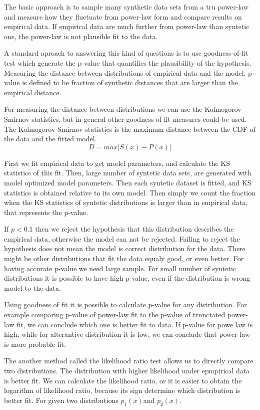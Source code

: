 The basic approach is to sample many synthetic data sets from a tru power-law and measure how they fluctuate from power-law form and compare results on empirical data. If empirical data are much further from power-law than syntetic one, the power-law is not plausible fit to the data. 


A standard aproach to answering this kind of questions is to use goodness-of-fit test which generate the p-value that quantifies the plausibility of the hypothesis. Measuring the distance between distributions of empirical data and the model. p-value is defined to be fraction of synthetic distances that are larger than the empirical distance. 

For measuring the distance between distributions we can use the Kolmogorov-Smirnov statistics, but in general other goodness of fit measures could be used.
The Kolmogorov Smirnov statistics is the maximum distance between the CDF of the data and the fitted model.  
\begin{equation}
D = max |S(x) - P(x)|
\end{equation}

First we fit empirical data to get model parameters, and calculate the KS statistics of this fit. Then, large number of syntetic data sets, are generated with model optimized model parameters. Then each syntetic dataset is fitted, and KS statistics is obtained relative to its own model. Then simply we count the fraction when the KS statistics of syntetic distributions is larger than in empirical data, that represents the p-value. 

If $p<0.1$ then we reject the hypothesis that this distribution describes the empirical data, otherwise the model can not be rejected. Failing to reject the hypothesis does not mean the model is correct distribution for the data. There might be other distributions that fit the data equaly good, or even better. For having accurate p-value we need large sample. For small number of syntetic distributions it is possible to have high p-value, even if the distribution is wrong model to the data. 

Using goodness of fit it is possible to calculate p-value for any distribution. For example comparing p-value of power-law fit to the p-value of trunctated power-law fit, we can conclude which one is better fit to data. If p-value for powe law is high, while for alterantive distribution it is low, we can conclude that power-law is more probable fit. 

The another method called the likelihood ratio test allows us to directly compare two distributions. The distribution with higher likelihood under epmpirical data is better fit. We can calculate the likelihood ratio, or it is easier to obtain the logarithm of likelihood ratio, because its sign determine which distribution is better fit. For given two distributions $p_1(x)$and $p_2(x)$. 


